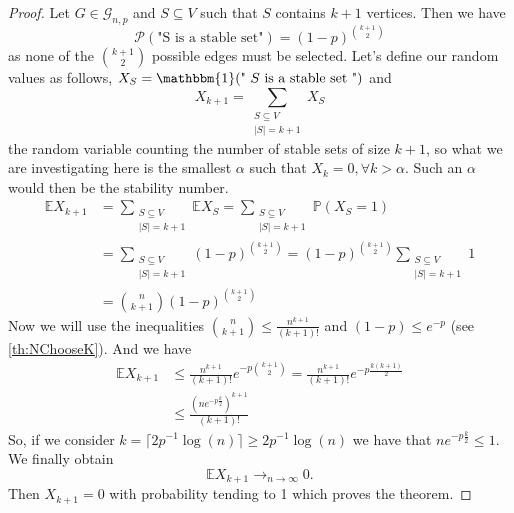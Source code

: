 \begin{proof}
	Let $G \in \mathcal{G}_{n,p}$ and $S \subseteq V$ such that $S$ contains $k+1$ vertices.
	Then we have 
	\begin{equation}
		\mathcal{P}(\text{"S is a stable set"}) = (1-p)^{\binom{k+1}{2}  }
	\end{equation}
	as none of the $\binom{k+1}{2}$ possible edges must be selected.
	\newline
	Let's define our random values as follows, $X_S = \mathbbm{1}(\text{" $S$ is a stable set "})$ and
	\begin{equation}
		X_{k+1} = \sum_{\substack{ S \subseteq V \\ |S| = k + 1}} X_S
	\end{equation}
	the random variable counting the number of stable sets of size $k+1$, so what we are investigating here is the smallest $\alpha$ such that $X_k = 0, \forall k > \alpha$. Such an $\alpha$ would then be the stability number.
	\begin{align}
		\mathbb{E}X_{k+1} &= \sum_{\substack{ S \subseteq V \\ |S| = k + 1}} \mathbb{E} X_S 	
				  = \sum_{\substack{ S \subseteq V \\ |S| = k + 1}} \mathbb{P}(X_S = 1)	\\		
		&= \sum_{\substack{ S \subseteq V \\ |S| = k + 1}} (1-p)^{\binom{k+1}{2}  }		
		= (1-p)^{\binom{k+1}{2}} \sum_{\substack{ S \subseteq V \\ |S| = k + 1}} 1 	\\	
		&= \binom{n}{k+1} (1-p)^{\binom{k+1}{2}} 
	\end{align}
	Now we will use the inequalities $  \binom{n}{k+1} \leq \frac{n^{k+1}}{(k+1)!} $ and $(1-p) \leq e^{-p}$ (see \ref{th:NChooseK}). 
	And we have
	\begin{align}
		\mathbb{E}X_{k+1} 	&\leq  \frac{n^{k+1}}{(k+1)!} e^{-p \binom{k+1}{2}} = \frac{n^{k+1}}{(k+1)!} e^{-p \frac{k(k+1)}{2}}\\
									     &\leq  \frac{(ne^{-p\frac{k}{2}})^{k+1}}{(k+1)!}
	\end{align}
	So, if we consider $k = \lceil 2p^{-1}\log(n)\rceil \geq 2p^{-1}\log(n)$ we have that $ ne^{-p\frac{k}{2}} \leq 1$.
	We finally obtain 
	\begin{equation}
		\mathbb{E} X_{k+1} \longrightarrow_{n \to \infty} 0.
	\end{equation}
	Then $X_{k+1} = 0$ with probability tending to 1 which proves the theorem.

\end{proof}

